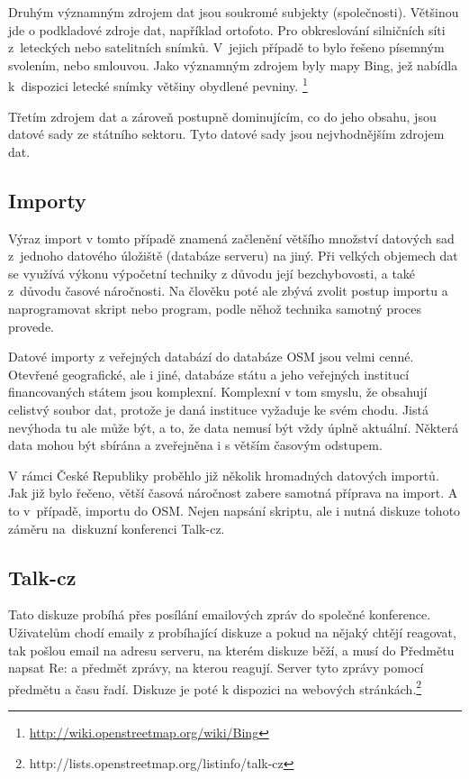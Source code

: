 Druhým významným zdrojem dat jsou soukromé subjekty (společnosti).
Většinou jde o podkladové zdroje dat, například ortofoto. Pro obkreslování
silničních síti z~leteckých nebo satelitních snímků. V~jejich případě to
bylo řešeno písemným svolením, nebo smlouvou. Jako významným zdrojem byly
mapy Bing, jež nabídla k~dispozici letecké snímky většiny
obydlené pevniny. \footnote{\url{http://wiki.openstreetmap.org/wiki/Bing}}

Třetím zdrojem dat a zároveň postupně dominujícím, co do jeho obsahu, jsou
datové sady ze státního sektoru. Tyto datové sady jsou nejvhodnějším zdrojem
dat.

\subsection{Importy}
\label{Importy}
Výraz import v tomto případě znamená začlenění většího množství datových sad
z~jednoho datového úložiště (databáze serveru) na jiný. Při velkých objemech dat
se využívá výkonu výpočetní techniky z důvodu její bezchybovosti, a také
z~důvodu časové náročnosti. Na člověku poté ale zbývá zvolit postup importu
a naprogramovat skript nebo program, podle něhož technika samotný proces
provede. 

Datové importy z veřejných databází do databáze OSM jsou velmi cenné. 
Otevřené geografické, ale i jiné, databáze státu a jeho veřejných institucí 
financovaných státem jsou komplexní. Komplexní v tom smyslu, že obsahují celistvý
soubor dat, protože je daná instituce vyžaduje ke svém chodu. Jistá nevýhoda tu 
ale může být, a to, že data nemusí být vždy úplně aktuální. Některá data mohou 
být sbírána a zveřejněna i s větším časovým odstupem.

V rámci České Republiky proběhlo již několik hromadných datových importů. Jak 
již bylo řečeno, větší časová náročnost zabere samotná příprava na import. A to
v~případě, importu do OSM. Nejen napsání skriptu, ale i nutná diskuze tohoto záměru
na~diskuzní konferenci Talk-cz. 

\subsection{Talk-cz}
\label{Talk-cz}
Tato diskuze probíhá přes posílání emailových zpráv do společné konference. 
Uživatelům chodí emaily z probíhající diskuze a pokud na nějaký chtějí reagovat,
tak pošlou email na adresu serveru, na kterém diskuze běží, a musí do Předmětu 
napsat Re: a předmět zprávy, na kterou reagují. Server tyto zprávy pomocí 
předmětu a času řadí. Diskuze je poté k dispozici na webových stránkách.\footnote{http://lists.openstreetmap.org/listinfo/talk-cz}


